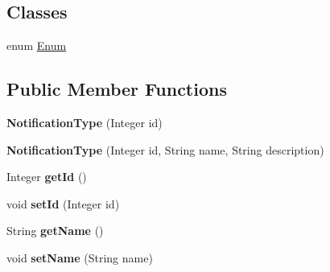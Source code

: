 \subsection*{Classes}
\begin{DoxyCompactItemize}
\item 
enum \hyperlink{enumit_1_1polimi_1_1se_1_1calcare_1_1entities_1_1NotificationType_1_1Enum}{Enum}
\end{DoxyCompactItemize}
\subsection*{Public Member Functions}
\begin{DoxyCompactItemize}
\item 
\hypertarget{classit_1_1polimi_1_1se_1_1calcare_1_1entities_1_1NotificationType_ab6c7b3c6cabb34e7769f175e7cb80573}{}{\bfseries Notification\+Type} (Integer id)\label{classit_1_1polimi_1_1se_1_1calcare_1_1entities_1_1NotificationType_ab6c7b3c6cabb34e7769f175e7cb80573}

\item 
\hypertarget{classit_1_1polimi_1_1se_1_1calcare_1_1entities_1_1NotificationType_a1fa03f7fb0fbfc21f7ac3749406c79f8}{}{\bfseries Notification\+Type} (Integer id, String name, String description)\label{classit_1_1polimi_1_1se_1_1calcare_1_1entities_1_1NotificationType_a1fa03f7fb0fbfc21f7ac3749406c79f8}

\item 
\hypertarget{classit_1_1polimi_1_1se_1_1calcare_1_1entities_1_1NotificationType_a8271d2e440430978423dc228adb76e55}{}Integer {\bfseries get\+Id} ()\label{classit_1_1polimi_1_1se_1_1calcare_1_1entities_1_1NotificationType_a8271d2e440430978423dc228adb76e55}

\item 
\hypertarget{classit_1_1polimi_1_1se_1_1calcare_1_1entities_1_1NotificationType_ac9087bee566bf31c9f06c81f8e9ae6c7}{}void {\bfseries set\+Id} (Integer id)\label{classit_1_1polimi_1_1se_1_1calcare_1_1entities_1_1NotificationType_ac9087bee566bf31c9f06c81f8e9ae6c7}

\item 
\hypertarget{classit_1_1polimi_1_1se_1_1calcare_1_1entities_1_1NotificationType_a000d0e0ad670bc07dab38a2f98397bd8}{}String {\bfseries get\+Name} ()\label{classit_1_1polimi_1_1se_1_1calcare_1_1entities_1_1NotificationType_a000d0e0ad670bc07dab38a2f98397bd8}

\item 
\hypertarget{classit_1_1polimi_1_1se_1_1calcare_1_1entities_1_1NotificationType_a2170dc67222379ca75fd7dcef59e0457}{}void {\bfseries set\+Name} (String name)\label{classit_1_1polimi_1_1se_1_1calcare_1_1entities_1_1NotificationType_a2170dc67222379ca75fd7dcef59e0457}


\end{DoxyCompactItemize}
